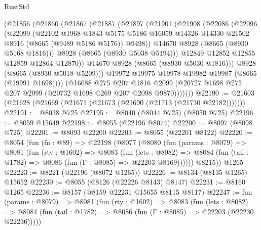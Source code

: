 \begin{lexlean}{RustStd}
\begin{coremodule}
          (@21856
            (@21860
              (@21867
                (@21887
                  (@21897
                    (@21901
                      (@21908
                        (@22086
                          (@22096
                            (@22099
                              (@22102
                                @1968
                                @1843
                                @5175
                                @5186
                                @16059
                                @14326
                                @14330
                                @21502
                                @8916
                                (@8665 (@9489 @5186 @5176))
                                @9498))
                            @14670
                            @8928
                            (@8665 (@8930 @5168 @1816)))
                          @8928
                          (@8665 (@8930 @5038 @5194)))
                        @12849
                        @12852
                        @12855
                        @12859
                        @12864
                        @12870))
                    @14670
                    @8928
                    (@8665 (@8930 @5030 @1816)))
                  @8928
                  (@8665 (@8930 @5018 @5209)))
                @19972
                @19975
                @19978
                @19982
                @19987
                (@8665 (@19991 @1698))))
            (@16088
              @275
              @207
              @1816
              @2099
              (@20727 @1698 @275 @207 @2099 (@20732 @1698 @269 @207 @2098 @9870)))))))
@22190 := @21603 (@21628 (@21669 (@21671 (@21673 (@21690 (@21713 (@21730 @22182)))))))
@22191 := @8038 @725
@22195 := @8040 (@8044 @725) (@8050 @725)
@22196 := @8059 @15649
@22198 := @8055 (@22196 @8074)
@22200 := @8097 (@8098 @725)
@22201 := @8093 @22200
@22203 := @8055 (@22201 @8122)
@22220 := @8054
    (fun (fn : @89) =>
    @22198
      (@8077
        (@8080
          (fun (params : @8079) =>
          @8081
            (fun (rty : @1602) =>
            @8083
              (fun (lets : @8082) =>
              @8084 (fun (tail : @1782) => @8086 (fun (Γ : @8085) => @22203 @8169))))))
        @8215))
    @1265
@22223 := @8221 (@22196 (@8072 @1265))
@22226 := @8134 (@8135 @1265) @15652
@22230 := @8055 (@8126 (@22226 @8143) @8147)
@22231 := @8160 @1265
@22236 := @8157 (@8159 @22231 @15655 @8115 @8117)
@22247 := fun (params : @8079) =>
  @8081
    (fun (rty : @1602) =>
    @8083
      (fun (lets : @8082) =>
      @8084 (fun (tail : @1782) => @8086 (fun (Γ : @8085) => @22203 (@22230 @22236)))))

\end{coremodule}
\end{lexlean}
